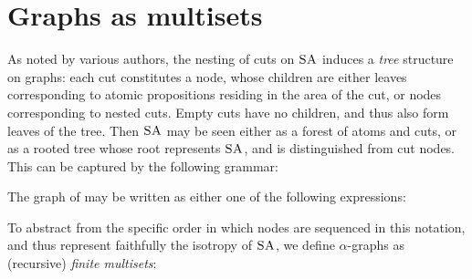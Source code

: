 
\section{Graphs as multisets}

As noted by various authors, the nesting of cuts on $\textsc{SA}$ induces a
\emph{tree} structure on graphs: each cut constitutes a node, whose children are
either leaves corresponding to atomic propositions residing in the area of the
cut, or nodes corresponding to nested cuts. Empty cuts have no children, and
thus also form leaves of the tree. Then $\textsc{SA}$ may be seen either as a forest of
atoms and cuts, or as a rooted tree whose root represents $\textsc{SA}$, and is
distinguished from cut nodes. This can be captured by the following grammar:

\begin{example}
The graph of  may be written as either one of the
following expressions:
\end{example}

To abstract from the specific order in which nodes are sequenced in this
notation, and thus represent faithfully the isotropy of $\textsc{SA}$, we define
$\alpha$-graphs as (recursive) \emph{finite multisets}:

